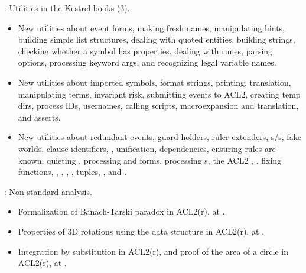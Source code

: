 
\begin{frame}

\implibtitle

:
Utilities in the Kestrel books (3).
\begin{itemize}
\item New utilities about event forms, making fresh names,
  manipulating hints, building simple list structures, dealing with
  quoted entities, building strings, checking whether a symbol has
  properties, dealing with runes, parsing options, processing keyword
  args, and recognizing legal variable names.
\item New utilities about imported symbols, format strings,
  printing, translation, manipulating terms, invariant risk,
  submitting events to ACL2, creating temp dirs, process IDs,
  usernames, calling scripts, macroexpansion and translation, and asserts.
\item New utilities about redundant events, guard-holders, ruler-extenders,
  s/s, fake worlds, clause identifiers,
  , unification, dependencies, ensuring rules are known,
  quieting , processing  and  forms,
  processing s, the ACL2 , ,
  fixing functions, , , ,
  , tuples, , and .
\end{itemize}

\end{frame}


\begin{frame}

\implibtitle

:
Non-standard analysis.
\begin{itemize}
\item Formalization of Banach-Tarski paradox in ACL2(r),
      at .
\item Properties of 3D rotations
      using the  data structure in ACL2(r),
      at .
\item Integration by substitution in ACL2(r),
      and proof of the area of a circle in ACL2(r),
      at .
\end{itemize}

\end{frame}

